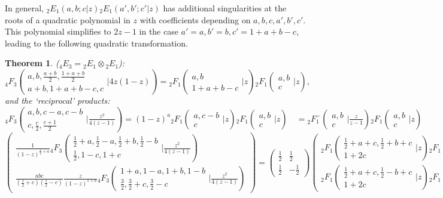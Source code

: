 \documentclass[12pt]{article}
\numberwithin{equation}{section}
\newtheorem{theorem}{Theorem}[section]
\newcommand{\Head}[3] {{}_{#1}{#2}_{#3}}
\newcommand{\ArgS}[3] {( \begin{smallmatrix} #1 \\ #2 \end{smallmatrix} | {#3})}
\newcommand{\FFs}[6] {{}_{#1}{#2}_{#3} ( \begin{smallmatrix} #4 \\ #5 \end{smallmatrix} | {#6}  )}
\newcommand{\FFes}[7] {{}_{#1}^{\,}{#2}_{#3}^{#4} ( \begin{smallmatrix} #5 \\ #6 \end{smallmatrix} | {#7} )}
\begin{document}
In general, $\Head{2}{E}{1}(a,b;c|z)\Head{2}{E}{1}(a',b';c'|z)$ has additional singularities at the roots of a quadratic polynomial in $z$ with coefficients depending on $a,b,c,a',b',c'$. This polynomial simplifies to $2z-1$ in the case $a'=a, b'=b, c'=1+a+b-c$, leading to the following quadratic transformation.
\begin{theorem}
\label{thm_4e3_2e1_2e1}
($\Head{4}{E}{3} = \Head{2}{E}{1} \otimes \Head{2}{E}{1}$):
\begin{equation*}
\Head{4}{F}{3} \ArgS{a, b, \frac{a + b}{2}, \frac{1 + a + b}{2}}{a + b, 1 + a + b - c, c}{4 z (1 - z)} = 
 \Head{2}{F}{1} \ArgS{a, b}{1 + a + b - c}{z} \Head{2}{F}{1} \ArgS{a, b}{c}{z}\text{,}
\end{equation*}
and the `reciprocal' products:
\begin{equation*}
\FFs{4}{F}{3}{a,b,c-a,c-b}{c, \frac{c}{2}, \frac{c+1}{2}}{\tfrac{z^2}{4(z-1)}} = (1-z)^a \FFs{2}{F}{1}{a,c-b}{c}{z} \FFs{2}{F}{1}{a,b}{c}{z} \quad =  \FFes{2}{F}{1}{-}{a,b}{c}{\tfrac{z}{z-1}} \FFs{2}{F}{1}{a,b}{c}{z}
\end{equation*}
\begin{equation*}
\left(\begin{array}{r}
\frac{1}{(1-z)^{\frac12+a}} \Head{4}{F}{3} \ArgS{\frac12+a,\frac12-a,\frac12+b,\frac12-b}{\frac{1}{2}, 1-c, 1+c}{\tfrac{z^2}{4(z-1)}}\\
\frac{a b c}{(\frac12+c)(\frac12-c)} \frac{z}{(1-z)^{1+a}} \Head{4}{F}{3} \ArgS{1+a,1-a,1+b,1-b}{\frac32, \frac32+c, \frac32-c}{\tfrac{z^2}{4(z-1)}}
\end{array}\right)
 =
\begin{pmatrix}
\tfrac12 & \tfrac12 \\
\tfrac12 & -\tfrac12
\end{pmatrix}
\begin{pmatrix}
\Head{2}{F}{1}\ArgS{\frac12+a+c,\frac12+b+c}{1+2c}{z} \Head{2}{F}{1}\ArgS{\frac12+a-c,\frac12-b-c}{1-2c}{z}
\\
\Head{2}{F}{1} \ArgS{\frac12+a+c,\frac12-b+c}{1+2c}{z}\Head{2}{F}{1} \ArgS{\frac12+a-c,\frac12+b-c}{1-2c}{z} \end{pmatrix}
\end{equation*}
\end{theorem}
\end{document}
